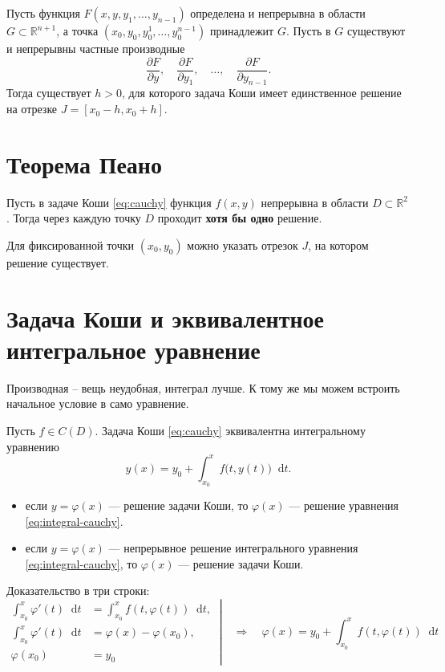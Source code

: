\documentclass[12pt,a4paper]{article}
\numberwithin{equation}{section}
\newcommand{\R}{\mathbb{R}}
\newcommand{\dd}{\mathop{}\!\mathrm{d}}
\DeclareRobustCommand{\examtag}[1]{\space{\normalfont\small\color{HSEgray}(#1)}}
\begin{document}
\begin{theoremHSE}
Пусть функция \(F(x,y,y_1,\ldots,y_{n-1})\) определена и непрерывна в
области \(G\subset\R^{n+1}\), а точка
\((x_0,y_0,y_0^1,\ldots,y_0^{n-1})\) принадлежит \(G\).
Пусть в \(G\) существуют и непрерывны частные производные
\[
 \frac{\partial F}{\partial y},\quad \frac{\partial F}{\partial y_1},
 \quad\ldots,\quad \frac{\partial F}{\partial y_{n-1}}.
\]
Тогда существует \(h>0\), для которого задача Коши имеет единственное
решение на отрезке \(J=[x_0-h,x_0+h]\).
\end{theoremHSE}

\section{Теорема Пеано\examtag{вопрос~6}}

\begin{theoremHSE}[Пеано]
Пусть в задаче Коши \eqref{eq:cauchy} функция $f(x,y)$ непрерывна в области $D\subset\mathbb{R}^2$. Тогда через каждую точку $D$ проходит \textbf{хотя бы одно} решение. 

Для фиксированной точки $(x_0,y_0)$ можно указать отрезок $J$, на котором решение существует.
\end{theoremHSE}

\section[Эквивалентное интегральное уравнение\examtag{вопрос~5}]{Задача Коши и эквивалентное интегральное уравнение\examtag{вопрос~5}}

Производная -- вещь неудобная, интеграл лучше. К тому же мы можем встроить начальное условие в само уравнение.

\begin{theoremHSE}
Пусть $f\in C(D)$. Задача Коши \eqref{eq:cauchy} эквивалентна интегральному уравнению
\begin{equation}
 y(x)=y_0+\int_{x_0}^{x} f\bigl(t,y(t)\bigr)\dd t.
 \label{eq:integral-cauchy}
\end{equation}
\begin{itemize}
\item если \(y=\varphi(x)\) --- решение задачи Коши, то \(\varphi(x)\) --- решение уравнения \eqref{eq:integral-cauchy}.
\item если \(y=\varphi(x)\) --- непрерывное решение интегрального уравнения \eqref{eq:integral-cauchy}, то \(\varphi(x)\) --- решение задачи Коши.
\end{itemize}
\end{theoremHSE}
Доказательство в три строки:
\[
\left.
\begin{aligned}
\int_{x_0}^{x}\varphi'(t)\dd t
    &= \int_{x_0}^{x}f(t,\varphi(t))\dd t,\\
\int_{x_0}^{x}\varphi'(t)\dd t
    &= \varphi(x)-\varphi(x_0),\\
\varphi(x_0) &= y_0
\end{aligned}\
\right|
\quad\Longrightarrow\quad
\varphi(x)=y_0+\int_{x_0}^{x}f(t,\varphi(t))\dd t
\]
\end{document}
